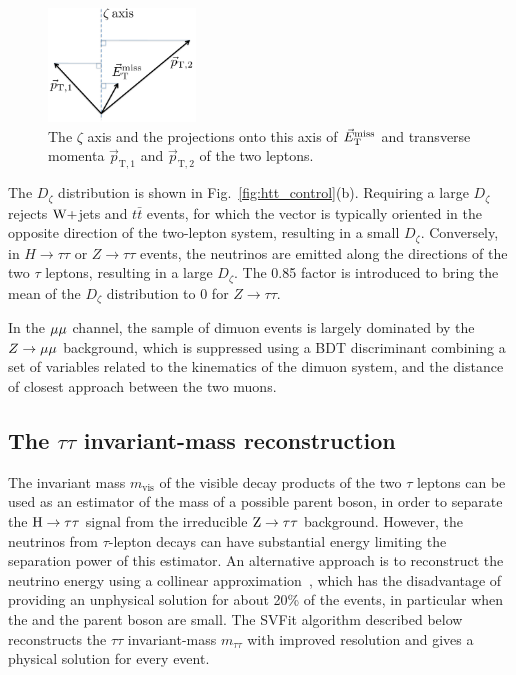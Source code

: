 \documentclass[12pt,twoside,a4paper,cmspaper,final,collab]{cms-tdr}
\begin{document}
\begin{figure}[htbp]
\begin{center}
\includegraphics[width=0.35\textwidth]{figures/htt/zeta_drawing.pdf}
\end{center}
\caption{The $\zeta$ axis and the projections onto this axis of ${\vec E}_{\mathrm{T}}^{\text{miss}}$ and transverse momenta $\vec{p}_\mathrm{T,1}$ and $\vec{p}_\mathrm{T,2}$ of the two leptons.}
\label{fig:htt_zeta_drawing}
\end{figure}

The $D_{\zeta}$ distribution is shown in Fig.~\ref{fig:htt_control}(b).
Requiring a large $D_{\zeta}$ rejects $\mathrm{W}+$jets and $t\bar t$ events, for which the \MET vector is typically oriented in the opposite direction of the two-lepton system, resulting in a small $D_{\zeta}$.
Conversely, in $H\to \tau \tau$ or $Z \to \tau \tau$ events, the
neutrinos are emitted along the directions of the two $\tau$ leptons, resulting in a large $D_{\zeta}$. The 0.85 factor is introduced to bring the mean of the $D_{\zeta}$ distribution to 0 for $Z \to \tau \tau$.

In the ${\mu}{\mu}$ channel, the sample of dimuon events is largely dominated by the $Z\rightarrow{\mu}{\mu}$ background,
which is suppressed using a BDT discriminant combining a set of variables related to the kinematics of the dimuon system,
and the distance of closest approach between the two muons.

\subsection{The \texorpdfstring{$\tau\tau$}{tau tau} invariant-mass reconstruction}
\label{sec:htt_mtautau}

The invariant mass $m_\text{vis}$ of the visible decay products of the
two $\tau$ leptons can be used as an estimator of the mass of
a possible parent boson, in order
to separate the $\mathrm{H} \to \tau \tau$ signal from the irreducible $\mathrm{Z} \to \tau \tau$ background.
However, the neutrinos from $\tau$-lepton decays can have substantial energy
limiting the separation power of this estimator.
An alternative approach is to reconstruct the neutrino energy using a collinear approximation~\cite{massRecoCollinearApprox},
which has the disadvantage of providing an unphysical solution for about 20\% of the events, in particular when the \MET and the parent
boson \PT are small.
The SVFit algorithm described below reconstructs the $\tau\tau$ invariant-mass $m_{\tau\tau}$ with improved resolution and gives a physical solution for every event.
\end{document}
